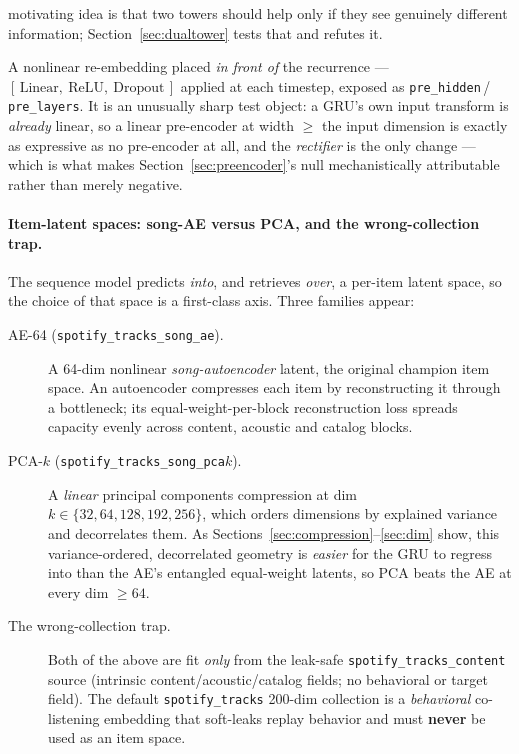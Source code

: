 \documentclass[11pt]{article}
\newcommand{\dsid}[1]{\texttt{\small #1}}
\begin{document}
\begin{description}
  motivating idea is that two towers should help only if they see genuinely
  different information; Section~\ref{sec:dualtower} tests that and refutes it.
  \item[Per-step pre-encoder.] A nonlinear re-embedding placed \emph{in front of}
  the recurrence --- $[\,\text{Linear},\ \text{ReLU},\ \text{Dropout}\,]$
  applied at each timestep, exposed as
  \texttt{pre\_hidden}\,/\,\texttt{pre\_layers}. It is an unusually sharp test
  object: a GRU's own input transform is \emph{already} linear, so a linear
  pre-encoder at width $\ge$ the input dimension is exactly as expressive as no
  pre-encoder at all, and the \emph{rectifier} is the only change --- which is
  what makes Section~\ref{sec:preencoder}'s null mechanistically attributable
  rather than merely negative.
\end{description}

\paragraph{Item-latent spaces: song-AE versus PCA, and the wrong-collection
trap.} The sequence model predicts \emph{into}, and retrieves \emph{over}, a
per-item latent space, so the choice of that space is a first-class axis. Three
families appear:
\begin{description}
  \item[AE-64 (\dsid{spotify\_tracks\_song\_ae}).] A 64-dim nonlinear
  \emph{song-autoencoder} latent, the original champion item space. An
  autoencoder compresses each item by reconstructing it through a bottleneck;
  its equal-weight-per-block reconstruction loss spreads capacity evenly across
  content, acoustic and catalog blocks.
  \item[PCA-$k$ (\dsid{spotify\_tracks\_song\_pca$k$}).] A \emph{linear} principal
  components compression at dim $k \in \{32,64,128,192,256\}$, which orders
  dimensions by explained variance and decorrelates them. As
  Sections~\ref{sec:compression}--\ref{sec:dim} show, this variance-ordered,
  decorrelated geometry is \emph{easier} for the GRU to regress into than the
  AE's entangled equal-weight latents, so PCA beats the AE at every dim $\ge 64$.
  \item[The wrong-collection trap.] Both of the above are fit \emph{only} from
  the leak-safe \dsid{spotify\_tracks\_content} source (intrinsic
  content/acoustic/catalog fields; no behavioral or target field). The default
  \dsid{spotify\_tracks} 200-dim collection is a \emph{behavioral} co-listening
  embedding that soft-leaks replay behavior and must \textbf{never} be used as an
  item space.
\end{description}
\end{document}
